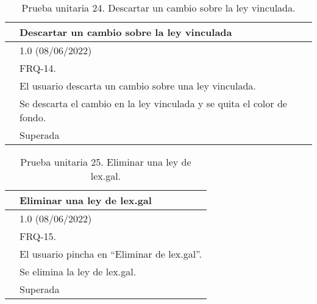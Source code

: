 \begin{table}[H]
\begin{center}
\begin{tabular}{|p{3cm}|p{10cm}|} \hline
\centering {\bf PU-24} & Descartar un cambio sobre la ley vinculada  \\ \hline\hline
\centering {\bf Versión} & 1.0 (08/06/2022) \\ \hline
\centering {\bf Dependencias} & FRQ-14. \\ \hline
\centering {\bf Descripción} &  El usuario descarta un cambio sobre una ley vinculada. \\ \hline
\centering {\bf Criterio de aceptación} & Se descarta el cambio en la ley vinculada y se quita el color de fondo. \\ \hline
\centering {\bf Estado} & Superada \\ \hline
\end{tabular}
\caption{Prueba unitaria 24. Descartar un cambio sobre la ley vinculada.}
\label{enlacePU24}
\end{center}
\end{table}

\begin{table}[H]
\begin{center}
\begin{tabular}{|p{3cm}|p{10cm}|} \hline
\centering {\bf PU-25} & Eliminar una ley de lex.gal  \\ \hline\hline
\centering {\bf Versión} & 1.0 (08/06/2022) \\ \hline
\centering {\bf Dependencias} & FRQ-15. \\ \hline
\centering {\bf Descripción} &  El usuario pincha en ``Eliminar de lex.gal''. \\ \hline
\centering {\bf Criterio de aceptación} & Se elimina la ley de lex.gal. \\ \hline
\centering {\bf Estado} & Superada \\ \hline
\end{tabular}
\caption{Prueba unitaria 25. Eliminar una ley de lex.gal.}
\label{enlacePU25}
\end{center}
\end{table}

